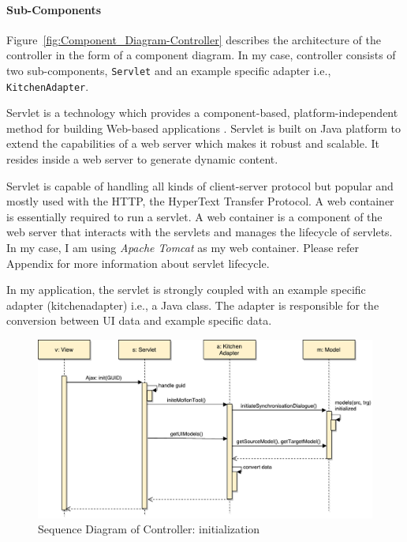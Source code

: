 \paragraph{Sub-Components}
Figure~\ref{fig:Component_Diagram-Controller} describes the architecture of the controller in the form of a component diagram. In my case, controller consists of two sub-components, \texttt{Servlet} and an example specific adapter i.e., \texttt{KitchenAdapter}.

Servlet is a technology which provides a component-based, platform-independent method for building Web-based applications \cite{servlet}. Servlet is built on Java platform to extend the capabilities of a web server which makes it robust and scalable. It resides inside a web server to generate dynamic content.

Servlet is capable of handling all kinds of client-server protocol but popular and mostly used with the HTTP, the HyperText Transfer Protocol. A web container is essentially required to run a servlet. A web container is a component of the web server that interacts with the servlets and manages the lifecycle of servlets. In my case, I am using \textit{Apache Tomcat} as my web container. Please refer Appendix for more information about servlet lifecycle.

In my application, the servlet is strongly coupled with an example specific adapter (kitchenadapter) i.e., a Java class. The adapter is responsible for the conversion between UI data and example specific data.

\begin{figure}
	\centering
	\includegraphics[width=1\textwidth]{figures/Sequence_Diagram-Controller(init)}
	\caption{Sequence Diagram of Controller: initialization}
	\label{fig:Sequence_Diagram-Controller(init)}
\end{figure}


